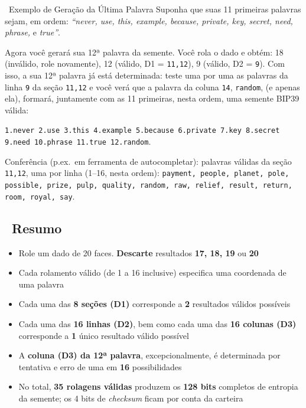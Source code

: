 \documentclass[10pt]{article}
\begin{document}
\begin{examplebox}{\faLightbulb~Exemplo de Geração da Última Palavra}
Suponha que suas 11 primeiras palavras sejam, em ordem: \textit{``never, use, this, example, because, private, key, secret, need, phrase,} e \textit{true''}.

Agora você gerará sua 12ª palavra da semente. Você rola o dado e obtém: 18 (inválido, role novamente), 12 (válido, D1 = \texttt{11,12}), 9 (válido, D2 = \texttt{9}). Com isso, a sua 12ª palavra já está determinada: teste uma por uma as palavras da linha \texttt{9} da seção \texttt{11,12} e você verá que a palavra da coluna \texttt{14}, \texttt{random}, (e apenas ela), formará, juntamente com as 11 primeiras, nesta ordem, uma semente BIP39 válida:

\vspace{0.5em}
\texttt{1.never 2.use 3.this 4.example 5.because 6.private 7.key 8.secret 9.need 10.phrase 11.true 12.random}. \faCheckCircle
\vspace{0.25em}

{\scriptsize Conferência (p.ex.\ em ferramenta de autocompletar): palavras válidas da seção \texttt{11,12}, uma por linha (1--16, nesta ordem): \texttt{payment, people, planet, pole, possible, prize, pulp, quality, random, raw, relief, result, return, room, royal, say}.\par}
\end{examplebox}

\subsection*{\faListOl~Resumo}

\begin{itemize}[itemsep=1pt]
 \item Role um dado de 20 faces. \textbf{Descarte} resultados \textbf{17, 18, 19} ou \textbf{20}
 \item Cada rolamento válido (de 1 a 16 inclusive) especifica uma coordenada de uma palavra
 \item Cada uma das \textbf{8 seções (D1)} corresponde a \textbf{2} resultados válidos possíveis
 \item Cada uma das \textbf{16 linhas (D2)}, bem como cada uma das \textbf{16 colunas (D3)} corresponde a \textbf{1} único resultado válido possível
 \item A \textbf{coluna (D3) da 12ª palavra}, excepcionalmente, é determinada por tentativa e erro de uma em \textbf{16} possibilidades
 \item No total, \textbf{35 rolagens válidas} produzem os \textbf{128 bits} completos de entropia da semente; os 4 bits de \textit{checksum} ficam por conta da carteira
\end{itemize}
\end{document}
